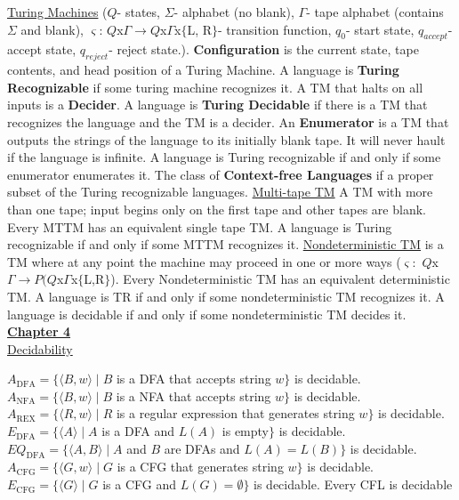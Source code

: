 \documentclass[9pt]{article}
\begin{document}
\uline{Turing Machines} ($Q$- states, $\Sigma$- alphabet (no blank), $\Gamma$- tape alphabet (contains $\Sigma$ and blank), $\varsigma$: $Q$x$\Gamma \rightarrow Q$x$\Gamma$x$\{$L, R$\}$- transition function, $q_0$- start state, $q_{accept}$- accept state, $q_{reject}$- reject state.). \textbf{Configuration} is the current state, tape contents, and head position of a Turing Machine. A language is \textbf{Turing Recognizable} if some turing machine recognizes it. A TM that halts on all inputs is a \textbf{Decider}. A language is \textbf{Turing Decidable} if there is a TM that recognizes the language and the TM is a decider. An \textbf{Enumerator} is a TM that outputs the strings of the language to its initially blank tape. It will never hault if the language is infinite. A language is Turing recognizable if and only if some enumerator enumerates it. The class of \textbf{Context-free Languages} if a proper subset of the Turing recognizable languages.\newline
\uline{Multi-tape TM} A TM with more than one tape; input begins only on the first tape and other tapes are blank. Every MTTM has an equivalent single tape TM. A language is Turing recognizable if and only if some MTTM recognizes it.\newline
\uline{Nondeterministic TM} is a TM where at any point the machine may proceed in one or more ways ($\varsigma:$ $Q$x$\Gamma\rightarrow P(Q$x$\Gamma$x$\{$L,R$\}$). Every Nondeterministic TM has an equivalent deterministic TM. A language is TR if and only if some nondeterministic TM recognizes it. A language is decidable if and only if some nondeterministic TM decides it.\newline
\uline{\textbf{Chapter 4}}\\
\uline{Decidability}\newline
\begin{minipage}[t]{.48\textwidth}
    \noindent$A_{\text{DFA}}=\{\langle B,w\rangle \mid B$ is a DFA that accepts string $w\}$ is decidable.\newline
    $A_{\text{NFA}}=\{\langle B,w\rangle\mid B$ is a NFA that accepts string $w\}$ is decidable.\newline
    $A_{\text{REX}}=\{\langle R, w\rangle \mid R$ is a regular expression that generates string $w\}$ is decidable.\newline
    $E_{\text{DFA}}=\{\langle A\rangle \mid A$ is a DFA and $L(A)$ is empty$\}$ is decidable.\newline
    $EQ_{\text{DFA}}=\{\langle A,B\rangle\mid A$ and $B$ are DFAs and $L(A)=L(B)\}$ is decidable.\newline
    $A_{\text{CFG}}=\{\langle G,w\rangle\mid G$ is a CFG that generates string $w\}$ is decidable.\newline
    $E_{\text{CFG}}=\{\langle G\rangle \mid G $ is a CFG and $L(G)=\emptyset\}$ is decidable.\newline
    Every CFL is decidable
\end{minipage}\hspace{.8cm}
\end{document}
